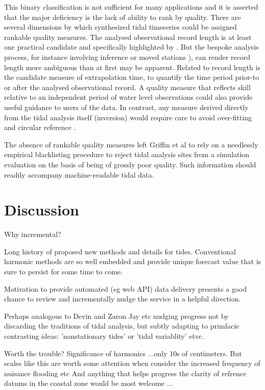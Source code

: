 This binary classification is not sufficient for many applications and it is asserted that the major deficiency is the lack of ability to rank by quality.   There are several dimensions by which synthesized tidal timeseries could be assigned rankable quality measures.    
The analysed observational record length is at least one practical candidate and specifically highlighted by \cite{MHL2156}. But the bespoke analysis process, for instance involving inference or moved stations \cite{godin:1972}), can render record length more ambiguous than at first may be apparent.    
Related to record length is the candidate measure of extrapolation time, to quantify the time period prior-to or after the analysed observational record.     
A quality measure that reflects skill relative to an independent period of water level observations could also provide useful guidance to users of the data.    In contrast, any measure derived directly from the tidal analysis itself (inversion) would require care to avoid over-fitting and circular reference \cite{Thompson2019}. 


The absence of rankable quality measures left Griffin et al \citep{10.5194/os-2020-107} to rely on a needlessly empirical blacklisting procedure to reject tidal analysis sites from a simulation evaluation on the basis of being of grossly poor quality. Such information should readily accompany machine-readable tidal data.


\section{Discussion}
\label{Sec:Discussion}

Why incremental?

Long history of proposed new methods and details for tides.
Conventional harmonic methods are so well embedded and provide unique forecast value that is sure to persist for some time to come.

Motivation to provide automated (eg web API) data delivery presents a good chance to review and incrementally nudge the service in a helpful direction.

Perhaps analogous to Devin and Zaron Jay etc nudging progress not by discarding the traditions of tidal analysis, but subtly adapting to primfacie contrasting ideas: 'nonstationary tides' or 'tidal variablity' etvc.


Worth the trouble?
Significance of harmonics ...only 10s  of centimeters.   But scales like this are worth some attention when consider the increased frequency of nuisance flooding etc
And anything that helps progress the clarity of refrence datums in the coastal zone would be most welcome ...


